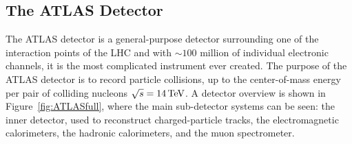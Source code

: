 \subsection{The ATLAS Detector}

The ATLAS detector \cite{ATLAS} is a general-purpose detector surrounding one of
the interaction points of the LHC and with $\sim 100$ million of individual
electronic channels, it is the most complicated instrument ever created.
The purpose of the ATLAS detector is to record particle collisions, up to the center-of-mass
energy per pair of colliding nucleons $\sqrt{s} = 14 \,\text{TeV}$. A detector overview is
shown in Figure~\ref{fig:ATLASfull}, where the main sub-detector systems can be
seen: the inner detector, used to reconstruct charged-particle tracks, the
electromagnetic calorimeters, the hadronic calorimeters, and the muon
spectrometer. 

